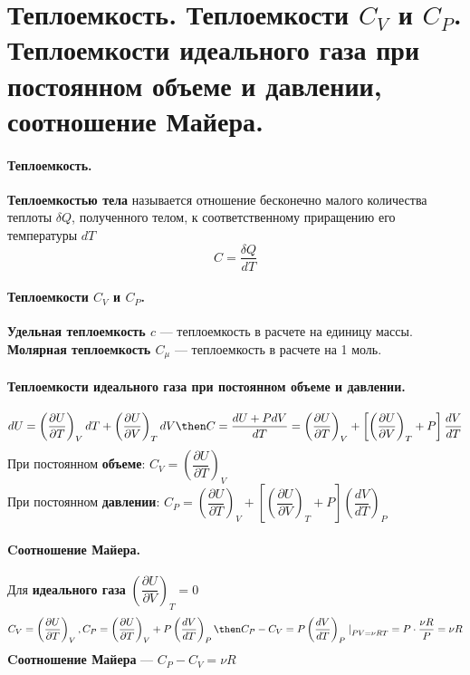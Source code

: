 \section{ \normalsize Теплоемкость. Теплоемкости $C_V$ и $C_P$. Теплоемкости идеального газа при постоянном объеме и давлении, соотношение Майера.}
\paragraph{Теплоемкость.}  \textbf{Теплоемкостью тела} называется отношение бесконечно малого количества теплоты $\delta Q$, полученного телом, к соответственному приращению его температуры $dT$ $$C = \dfrac{\delta Q}{dT}$$
\paragraph{Теплоемкости $C_V$ и $C_P$.} \textbf{Удельная теплоемкость $c$} --- теплоемкость в расчете на единицу массы.\\
\textbf{Молярная теплоемкость $C_\mu$} --- теплоемкость в расчете на 1 моль.
\paragraph{Теплоемкости идеального газа при постоянном объеме и давлении.}
$$dU = \left(\dfrac{\partial U}{\partial T}\right)_V dT + \left(\dfrac{\partial U}{\partial V}\right)_T dV  \then C = \dfrac{dU + PdV}{dT} = \left(\dfrac{\partial U}{\partial T}\right)_V + \left[\left(\dfrac{\partial U}{\partial V}\right)_T +P\right]\dfrac{dV}{dT}$$
При постоянном \textbf{объеме}: $C_V = \left(\dfrac{\partial U}{\partial T}\right)_V$\\
При постоянном \textbf{давлении}: $C_P= \left(\dfrac{\partial U}{\partial T}\right)_V + \left[\left(\dfrac{\partial U}{\partial V}\right)_T +P\right]\left(\dfrac{dV}{dT}\right)_P$\\
\paragraph{Cоотношение Майера.} Для \textbf{идеального газа} $\left(\dfrac{\partial U}{\partial V}\right)_T = 0$
$$C_V = \left(\dfrac{\partial U}{\partial T}\right)_V, C_P = \left(\dfrac{\partial U}{\partial T}\right)_V + P\left(\dfrac{dV}{dT}\right)_P \then C_P-C_V = P\left(\dfrac{dV}{dT}\right)_P\left.\right|_{PV=\nu RT}=P\cdot\dfrac{\nu R}{P}=\nu R$$
\textbf{Cоотношение Майера} --- $C_P-C_V = \nu R$

